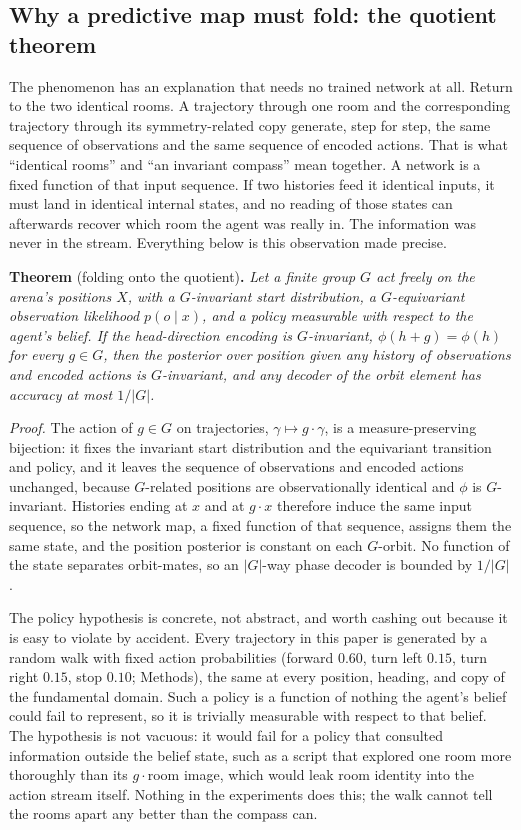 \subsection*{Why a predictive map must fold: the quotient theorem}

The phenomenon has an explanation that needs no trained network at all. Return to the two identical
rooms. A trajectory through one room and the corresponding trajectory through its symmetry-related
copy generate, step for step, the same sequence of observations and the same sequence of encoded
actions. That is what ``identical rooms'' and ``an invariant compass'' mean together. A network is
a fixed function of that input sequence. If two histories feed it identical inputs, it must land in
identical internal states, and no reading of those states can afterwards recover which room the agent
was really in. The information was never in the stream. Everything below is this observation made
precise.

\noindent\textbf{Theorem} (folding onto the quotient)\textbf{.} \emph{Let a finite group $G$ act
freely on the arena's positions $X$, with a $G$-invariant start distribution, a $G$-equivariant
observation likelihood $p(o \mid x)$, and a policy measurable with respect to the agent's belief. If
the head-direction encoding is $G$-invariant, $\phi(h + g) = \phi(h)$ for every $g \in G$, then the
posterior over position given any history of observations and encoded actions is $G$-invariant, and
any decoder of the orbit element has accuracy at most $1/|G|$.}

\noindent\emph{Proof.} The action of $g \in G$ on trajectories, $\gamma \mapsto g\cdot\gamma$, is a
measure-preserving bijection: it fixes the invariant start distribution and the equivariant
transition and policy, and it leaves the sequence of observations and encoded actions unchanged,
because $G$-related positions are observationally identical and $\phi$ is $G$-invariant. Histories
ending at $x$ and at $g\cdot x$ therefore induce the same input sequence, so the network map, a
fixed function of that sequence, assigns them the same state, and the position posterior is constant
on each $G$-orbit. No function of the state separates orbit-mates, so an $|G|$-way phase decoder is
bounded by $1/|G|$.

The policy hypothesis is concrete, not abstract, and worth cashing out because it is easy to violate
by accident. Every trajectory in this paper is generated by a random walk with fixed action
probabilities (forward $0.60$, turn left $0.15$, turn right $0.15$, stop $0.10$; Methods), the same
at every position, heading, and copy of the fundamental domain. Such a policy is a function of
nothing the agent's belief could fail to represent, so it is trivially measurable with respect to
that belief. The hypothesis is not vacuous: it would fail for a policy that consulted information
outside the belief state, such as a script that explored one room more thoroughly than its $g\cdot$room
image, which would leak room identity into the action stream itself. Nothing in the experiments
does this; the walk cannot tell the rooms apart any better than the compass can.


